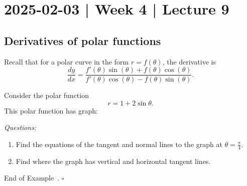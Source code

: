 \documentclass[10pt]{article}
\theoremstyle{definition}
\newtheorem{example}[theorem]{Example}
\renewenvironment{example}
{\begin{oldexample}}
  {\par\smallskip\hfill   End of Example~\theexample. $\square$    \par\end{oldexample}}
\newcommand{\1}[1]{\textbf{1}_{\left[#1\right]}} %
\begin{document}
\newpage
\section{2025-02-03 | Week 4 | Lecture 9}
\subsection{Derivatives of polar functions}
Recall that for a polar curve in the form $r = f(\theta)$, the derivative is
\begin{equation}\label{eq:derivative-of-polar-curve}
  \boxed{
    \frac{dy}{dx} = \frac{f'(\theta)\sin(\theta) + f(\theta)\cos(\theta)}{f'(\theta)\cos(\theta)-f(\theta)\sin(\theta)}.
  }
\end{equation}

\begin{example}
  Consider the polar function
  \begin{equation*}
    r = 1+2\sin \theta.
  \end{equation*}
  This polar function has graph:
  \begin{center}
  \end{center}
  \textit{Questions:}
  \begin{enumerate}
    \item Find the equations of the tangent and normal lines to the graph at $\theta=\frac{\pi}{4}$.
    \item Find where the graph has vertical and horizontal tangent lines.
  \end{enumerate}


\end{example}
\end{document}
